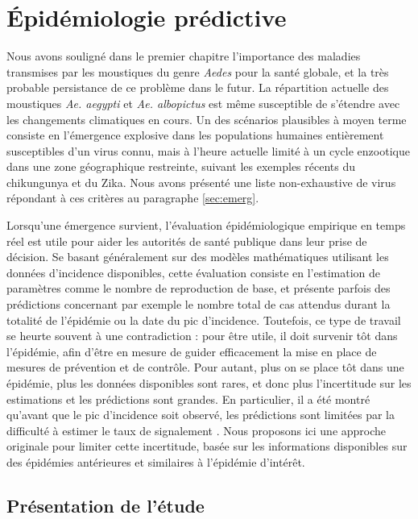 \chapter{Épidémiologie prédictive}
\chaptermark{}

Nous avons souligné dans le premier chapitre l'importance des maladies transmises par les moustiques du genre {\em Aedes} pour la santé globale, et la très probable persistance de ce problème dans le futur.
La répartition actuelle des moustiques {\em Ae. aegypti} et {\em Ae. albopictus} est même susceptible de s'étendre avec les changements climatiques en cours.
Un des scénarios plausibles à moyen terme consiste en l'émergence explosive dans les populations humaines entièrement susceptibles d'un virus connu, mais à l'heure actuelle limité à un cycle enzootique dans une zone géographique restreinte, suivant les exemples récents du chikungunya et du Zika.
Nous avons présenté une liste non-exhaustive de virus répondant à ces critères au paragraphe \ref{sec:emerg}.

Lorsqu'une émergence survient, l'évaluation épidémiologique empirique en temps réel est utile pour aider les autorités de santé publique dans leur prise de décision.
Se basant généralement sur des modèles mathématiques utilisant les données d'incidence disponibles, cette évaluation consiste en l'estimation de paramètres comme le nombre de reproduction de base, et présente parfois des prédictions concernant par exemple le nombre total de cas attendus durant la totalité de l'épidémie ou la date du pic d'incidence.
Toutefois, ce type de travail se heurte souvent à une contradiction : pour être utile, il doit survenir tôt dans l'épidémie, afin d'être en mesure de guider efficacement la mise en place de mesures de prévention et de contrôle.
Pour autant, plus on se place tôt dans une épidémie, plus les données disponibles sont rares, et donc plus l'incertitude sur les estimations et les prédictions sont grandes.
En particulier, il a été montré qu'avant que le pic d'incidence soit observé, les prédictions sont limitées par la difficulté à estimer le taux de signalement \cite{heesterbeek2015modeling}.
Nous proposons ici une approche originale pour limiter cette incertitude, basée sur les informations disponibles sur des épidémies antérieures et similaires à l'épidémie d'intérêt.

\section{Présentation de l'étude}

